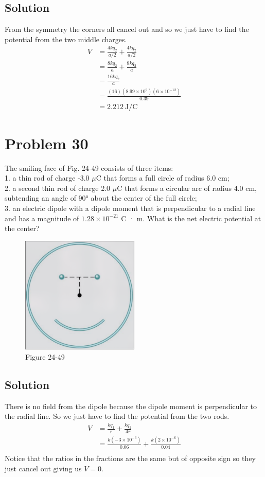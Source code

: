 \documentclass{article}
\newcommand{\J}{\text{J}}
\newcommand{\C}{\text{C}}
\begin{document}
\subsection*{Solution}
From the symmetry the corners all cancel out and so we just have to find the potential from the two middle charges.
\begin{align*}
	V &= \frac{4kq_2}{a/2} + \frac{4kq_2}{a/2} \\ 
	&= \frac{8kq_2}{a} + \frac{8kq_2}{a} \\
	&= \frac{16kq_2}{a} \\
	&= \frac{(16) (8.99 \times 10^9) (6 \times 10^{-12})}{0.39} \\
	&= \boxed{2.212\ \J/\C}
\end{align*}

\section*{Problem 30}
The smiling face of Fig. 24-49 consists of three items:\\
1. a thin rod of charge -3.0 $\mu$C that forms a full circle of radius 6.0 cm;\\
2. a second thin rod of charge 2.0 $\mu$C that forms a circular arc of radius 4.0 cm, subtending an angle of 90° about the center of the full circle;\\
3. an electric dipole with a dipole moment that is perpendi­cular to a radial line and has a magnitude of $1.28 \times 10^{-21}$ C · m.
What is the net electric potential at the center?

\begin{figure}[h]
	\centering
	\includegraphics[width=0.5\textwidth]{image-8.png}
	\caption{Figure 24-49}
\end{figure}

\subsection*{Solution}
There is no field from the dipole because the dipole moment is perpendicular to the radial line. So we just have to find the potential from the two rods.
\begin{align*}
	V &= \frac{kq_1}{r} + \frac{kq_2}{4r} \\
	&= \frac{k(-3 \times 10^{-6})}{0.06} + \frac{k(2 \times 10^{-6})}{0.04} \\
\end{align*}
Notice that the ratios in the fractions are the same but of opposite sign so they just cancel out giving us $V = 0$.
\end{document}
